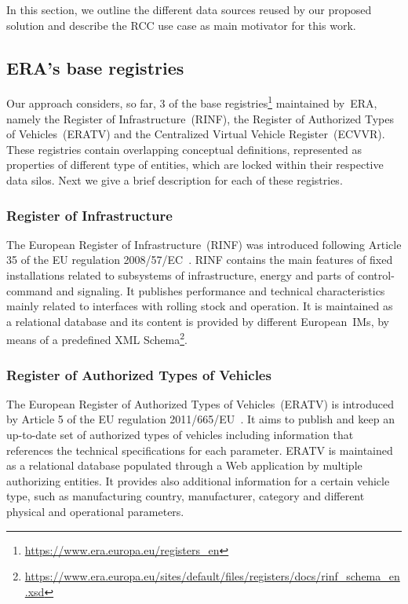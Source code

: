 In this section,
we outline %
the different
data sources reused by our proposed solution
and describe the RCC use case
as %
main motivator for this work.

\subsection{ERA's base registries}
Our approach considers, so far,
3 of the base registries\footnote{\url{https://www.era.europa.eu/registers_en}} maintained by~ERA,
namely the Register of Infrastructure~(RINF),
the Register of Authorized Types of Vehicles~(ERATV)
and the Centralized Virtual Vehicle Register~(ECVVR).
These registries contain overlapping conceptual definitions,
represented as properties of different type of entities,
which are locked within their respective data silos.
Next we give a brief description for each of these registries.

\subsubsection{Register of Infrastructure}
The European Register of Infrastructure~(RINF)
was introduced following Article 35
of the EU regulation 2008/57/EC~\cite{eu-57-2008}.
RINF contains the main features of fixed installations
related to subsystems of infrastructure,
energy and parts of control-command and signaling.
It publishes performance and technical characteristics
mainly related to interfaces with rolling stock and operation.
It is maintained as a relational database
and its content is provided by different European~IMs,
by means of a predefined XML Schema\footnote{\url{https://www.era.europa.eu/sites/default/files/registers/docs/rinf_schema_en.xsd}}.

\subsubsection{Register of Authorized Types of Vehicles}
The European Register of Authorized Types of Vehicles~(ERATV)
is introduced by Article 5 of the EU regulation 2011/665/EU~\cite{eu-65-2011}.
It aims to publish and keep an up-to-date set of authorized types of vehicles
including information that references the technical specifications for each parameter.
ERATV is maintained as a relational database
populated through a Web application by multiple authorizing entities.
It provides also additional information for a certain vehicle type,
such as manufacturing country, manufacturer, category
and different physical and operational parameters.

